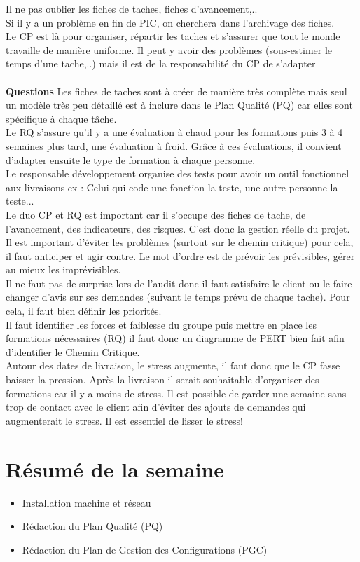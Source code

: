 \documentclass [a4paper] {article}
\begin{document}
Il ne pas oublier les fiches de taches, fiches d'avancement,.. \\
Si il y a un problème en fin de PIC, on cherchera dans l'archivage des fiches. 
\\
Le CP est là pour organiser, répartir les taches et s'assurer que tout le monde travaille de manière uniforme. Il peut y avoir des problèmes (sous-estimer le temps d'une tache,..) mais il est de la responsabilité du CP de s'adapter
\\
~~\\
\textbf{Questions}
Les fiches de taches sont à créer de manière très complète mais seul un modèle très peu détaillé est à inclure dans le Plan Qualité (PQ) car elles sont spécifique à chaque tâche.
\\
Le RQ s'assure qu'il y a une évaluation à chaud pour les formations puis 3 à 4 semaines plus tard, une évaluation à froid. Grâce à ces évaluations, il convient d'adapter ensuite le type de formation à chaque personne.
\\
Le responsable développement organise des tests pour avoir un outil fonctionnel aux livraisons
ex : Celui qui code une fonction la teste, une autre personne la teste...
\\
Le duo CP et RQ est important car il s'occupe des fiches de tache, de l'avancement, des indicateurs, des risques. C'est donc la gestion réelle du projet. Il est important d'éviter les problèmes (surtout sur le chemin critique) pour cela, il faut anticiper et agir contre. Le mot d'ordre est de prévoir les prévisibles, gérer au mieux les imprévisibles.
\\
Il ne faut pas de surprise lors de l'audit donc il faut satisfaire le client ou le faire changer d'avis sur ses demandes (suivant le temps prévu de chaque tache). Pour cela, il faut bien définir les priorités.
\\
Il faut identifier les forces et faiblesse du groupe puis mettre en place les formations nécessaires (RQ) il faut donc un diagramme de PERT bien fait afin d'identifier le Chemin Critique.
\\
Autour des dates de livraison, le stress augmente, il faut donc que le CP fasse baisser la pression. Après la livraison il serait souhaitable d'organiser des formations car il y a moins de stress. Il est possible de garder une semaine sans trop de contact avec le client afin d'éviter des ajouts de demandes qui augmenterait le stress.
Il est essentiel de lisser le stress!

\section{Résumé de la semaine}
\begin{itemize}
\item Installation machine et réseau
\item Rédaction du Plan Qualité (PQ)
\item Rédaction du Plan de Gestion des Configurations (PGC)
\end{itemize}
\end{document}
